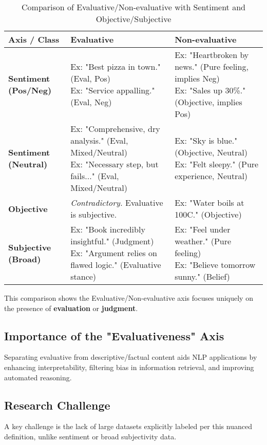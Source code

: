 \documentclass{article}
\begin{document}
\begin{table}[htbp]
\centering
\caption{Comparison of Evaluative/Non-evaluative with Sentiment and Objective/Subjective}
\label{tab:evaluative_comparison}
\begin{tabular}{p{3cm} | p{5.5cm} | p{5.5cm}}
\toprule
Axis / Class & \textbf{Evaluative} & \textbf{Non-evaluative} \\
\midrule
\textbf{Sentiment (Pos/Neg)} &
\makecell[l]{Ex: "Best pizza in town." (Eval, Pos) \\ Ex: "Service appalling." (Eval, Neg)} &
\makecell[l]{Ex: "Heartbroken by news." (Pure feeling, implies Neg) \\ Ex: "Sales up 30\%." (Objective, implies Pos)} \\
\midrule
\textbf{Sentiment (Neutral)} &
\makecell[l]{Ex: "Comprehensive, dry analysis." (Eval, Mixed/Neutral) \\ Ex: "Necessary step, but fails..." (Eval, Mixed/Neutral)} &
\makecell[l]{Ex: "Sky is blue." (Objective, Neutral) \\ Ex: "Felt sleepy." (Pure experience, Neutral)} \\
\midrule
\textbf{Objective} & \textit{Contradictory.} Evaluative is subjective. & Ex: "Water boils at 100C." (Objective) \\
\midrule
\textbf{Subjective (Broad)} &
\makecell[l]{Ex: "Book incredibly insightful." (Judgment) \\ Ex: "Argument relies on flawed logic." (Evaluative stance)} &
\makecell[l]{Ex: "Feel under weather." (Pure feeling) \\ Ex: "Believe tomorrow sunny." (Belief)} \\
\bottomrule
\end{tabular}
\end{table}

This comparison shows the Evaluative/Non-evaluative axis focuses uniquely on the presence of \textbf{evaluation} or \textbf{judgment}.

\subsection{Importance of the "Evaluativeness" Axis}
\label{sec:why_evaluativeness}
Separating evaluative from descriptive/factual content aids NLP applications by enhancing interpretability, filtering bias in information retrieval, and improving automated reasoning.

\subsection{Research Challenge}
A key challenge is the lack of large datasets explicitly labeled per this nuanced definition, unlike sentiment or broad subjectivity data.
\end{document}
